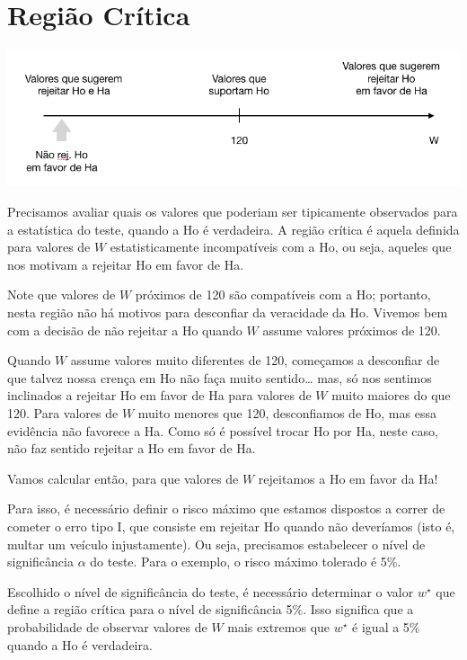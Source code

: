 \documentclass[
]{book}
\theoremstyle{definition}
\theoremstyle{definition}
\theoremstyle{definition}
\theoremstyle{remark}
\begin{document}
\hypertarget{regiuxe3o-cruxedtica}{%
\section{Região Crítica}\label{regiuxe3o-cruxedtica}}

\includegraphics[width=1\linewidth]{img/regiao-critica}

Precisamos avaliar quais os valores que poderiam ser tipicamente observados para a estatística do teste, quando a Ho é verdadeira. A região crítica é aquela definida para valores de \(W\) estatisticamente incompatíveis com a Ho, ou seja, aqueles que nos motivam a rejeitar Ho em favor de Ha.

Note que valores de \(W\) próximos de 120 são compatíveis com a Ho; portanto, nesta região não há motivos para desconfiar da veracidade da Ho. Vivemos bem com a decisão de não rejeitar a Ho quando \(W\) assume valores próximos de 120.

Quando \(W\) assume valores muito diferentes de 120, começamos a desconfiar de que talvez nossa crença em Ho não faça muito sentido\ldots{} mas, só nos sentimos inclinados a rejeitar Ho em favor de Ha para valores de \(W\) muito maiores do que 120. Para valores de \(W\) muito menores que 120, desconfiamos de Ho, mas essa evidência não favorece a Ha. Como só é possível trocar Ho por Ha, neste caso, não faz sentido rejeitar a Ho em favor de Ha.

Vamos calcular então, para que valores de \(W\) rejeitamos a Ho em favor da Ha!

Para isso, é necessário definir o risco máximo que estamos dispostos a correr de cometer o erro tipo I, que consiste em rejeitar Ho quando não deveríamos (isto é, multar um veículo injustamente). Ou seja, precisamos estabelecer o nível de significância \(\alpha\) do teste. Para o exemplo, o risco máximo tolerado é 5\%.

Escolhido o nível de significância do teste, é necessário determinar o valor \(w^\star\) que define a região crítica para o nível de significância 5\%. Isso significa que a probabilidade de observar valores de \(W\) mais extremos que \(w^\star\) é igual a 5\% quando a Ho é verdadeira.
\end{document}
